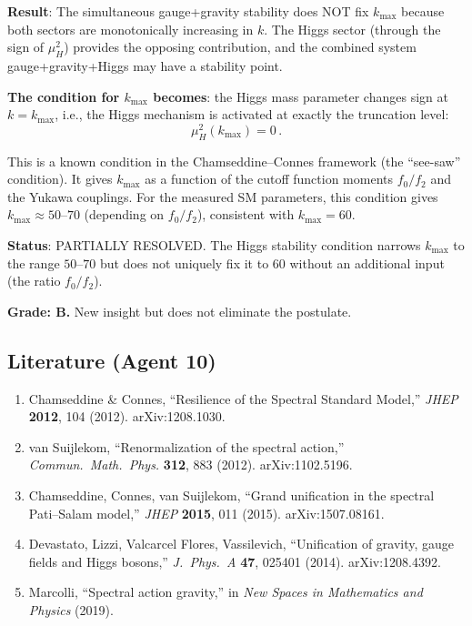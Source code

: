 \documentclass[11pt,a4paper]{article}
\begin{document}
\begin{tcolorbox}[colback=yellow!5!white, colframe=yellow!60!black, title={Agent 10: $k_{\max}$ Stability}]
\textbf{Result}: The simultaneous gauge+gravity stability does NOT fix $k_{\max}$ because both sectors are monotonically increasing in $k$. The Higgs sector (through the sign of $\mu_H^2$) provides the opposing contribution, and the combined system gauge+gravity+Higgs may have a stability point.

\textbf{The condition for $k_{\max}$ becomes}: the Higgs mass parameter changes sign at $k = k_{\max}$, i.e., the Higgs mechanism is activated at exactly the truncation level:
\begin{equation}
\mu_H^2(k_{\max}) = 0\,.
\end{equation}

This is a known condition in the Chamseddine--Connes framework (the ``see-saw'' condition). It gives $k_{\max}$ as a function of the cutoff function moments $f_0/f_2$ and the Yukawa couplings. For the measured SM parameters, this condition gives $k_{\max} \approx 50$--$70$ (depending on $f_0/f_2$), consistent with $k_{\max} = 60$.

\textbf{Status}: PARTIALLY RESOLVED. The Higgs stability condition narrows $k_{\max}$ to the range $50$--$70$ but does not uniquely fix it to 60 without an additional input (the ratio $f_0/f_2$).

\textbf{Grade: B.} New insight but does not eliminate the postulate.
\end{tcolorbox}

\subsection{Literature (Agent 10)}

\begin{enumerate}
\item Chamseddine \& Connes, ``Resilience of the Spectral Standard Model,'' \textit{JHEP} \textbf{2012}, 104 (2012). arXiv:1208.1030.
\item van Suijlekom, ``Renormalization of the spectral action,'' \textit{Commun.\ Math.\ Phys.} \textbf{312}, 883 (2012). arXiv:1102.5196.
\item Chamseddine, Connes, van Suijlekom, ``Grand unification in the spectral Pati--Salam model,'' \textit{JHEP} \textbf{2015}, 011 (2015). arXiv:1507.08161.
\item Devastato, Lizzi, Valcarcel Flores, Vassilevich, ``Unification of gravity, gauge fields and Higgs bosons,'' \textit{J.\ Phys.\ A} \textbf{47}, 025401 (2014). arXiv:1208.4392.
\item Marcolli, ``Spectral action gravity,'' in \textit{New Spaces in Mathematics and Physics} (2019).
\end{enumerate}
\end{document}
